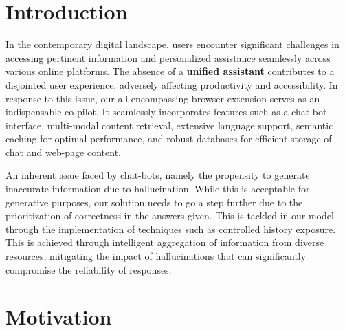 \documentclass[sigconf,natbib=true,anonymous=false]{acmart}
\begin{document}


\maketitle

\section{Introduction}
In the contemporary digital landscape, users encounter significant challenges in accessing pertinent information and personalized assistance seamlessly across various online platforms. The absence of a \textbf{unified assistant} contributes to a disjointed user experience, adversely affecting productivity and accessibility. In response to this issue, our all-encompassing browser extension serves as an indispensable co-pilot. It seamlessly incorporates features such as a chat-bot interface, multi-modal content retrieval, extensive language support, semantic caching for optimal performance, and robust databases for efficient storage of chat and web-page content.

An inherent issue faced by chat-bots, namely the propensity to generate inaccurate information due to hallucination. While this is acceptable for generative purposes, our solution needs to go a step further due to the prioritization of correctness in the answers given. This is tackled in our model through the implementation of techniques such as controlled history exposure. This is achieved through intelligent aggregation of information from diverse resources, mitigating the impact of hallucinations that can significantly compromise the reliability of responses.


\section{Motivation}
\end{document}
